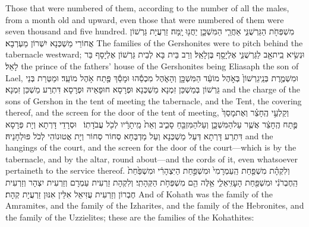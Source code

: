 {Those that were numbered of them, according to the number of all the males, from a month old and upward, even those that were numbered of them were seven thousand and five hundred.}{}
{מִשְׁפְּחֹ֖ת הַגֵּרְשֻׁנִּ֑י אַחֲרֵ֧י הַמִּשְׁכָּ֛ן יַחֲנ֖וּ יָֽמָּה׃}
{זַרְעֲיָת גֵּרְשׁוֹן אֲחוֹרֵי מַשְׁכְּנָא יִשְׁרוֹן מַעְרְבָא׃}
{The families of the Gershonites were to pitch behind the tabernacle westward;}{}
{וּנְשִׂ֥יא בֵֽית\maqqaf אָ֖ב לַגֵּרְשֻׁנִּ֑י אֶלְיָסָ֖ף בֶּן\maqqaf לָאֵֽל׃}
{וְרַב בֵּית בָּא לְבֵית גֵּרְשׁוֹן אֶלְיָסָף בַּר לָאֵל׃}
{the prince of the fathers’ house of the Gershonites being Eliasaph the son of Lael,}{}
{וּמִשְׁמֶ֤רֶת בְּנֵֽי\maqqaf גֵרְשׁוֹן֙ בְּאֹ֣הֶל מוֹעֵ֔ד הַמִּשְׁכָּ֖ן וְהָאֹ֑הֶל מִכְסֵ֕הוּ וּמָסַ֕ךְ פֶּ֖תַח אֹ֥הֶל מוֹעֵֽד׃}
{וּמַטְּרַת בְּנֵי גֵּרְשׁוֹן בְּמַשְׁכַּן זִמְנָא מַשְׁכְּנָא וּפְרָסָא חוּפָאֵיהּ וּפְרָסָא דִּתְרַע מַשְׁכַּן זִמְנָא׃}
{and the charge of the sons of Gershon in the tent of meeting the tabernacle, and the Tent, the covering thereof, and the screen for the door of the tent of meeting,}{}
{וְקַלְעֵ֣י הֶֽחָצֵ֗ר וְאֶת\maqqaf מָסַךְ֙ פֶּ֣תַח הֶֽחָצֵ֔ר אֲשֶׁ֧ר עַל\maqqaf הַמִּשְׁכָּ֛ן וְעַל\maqqaf הַמִּזְבֵּ֖חַ סָבִ֑יב וְאֵת֙ מֵֽיתָרָ֔יו לְכֹ֖ל עֲבֹדָתֽוֹ׃ \setuma }
{וּסְרָדֵי דָּרְתָא וְיָת פְּרָסָא דִּתְרַע דָּרְתָא דְּעַל מַשְׁכְּנָא וְעַל מַדְבְּחָא סְחוֹר סְחוֹר וְיָת אֲטוּנוֹהִי לְכֹל פּוּלְחָנֵיהּ׃}
{and the hangings of the court, and the screen for the door of the court—which is by the tabernacle, and by the altar, round about—and the cords of it, even whatsoever pertaineth to the service thereof.}{}
{וְלִקְהָ֗ת מִשְׁפַּ֤חַת הַֽעַמְרָמִי֙ וּמִשְׁפַּ֣חַת הַיִּצְהָרִ֔י וּמִשְׁפַּ֙חַת֙ הַֽחֶבְרֹנִ֔י וּמִשְׁפַּ֖חַת הָעׇזִּֽיאֵלִ֑י אֵ֥לֶּה הֵ֖ם מִשְׁפְּחֹ֥ת הַקְּהָתִֽי׃}
{וְלִקְהָת זַרְעִית עַמְרָם וְזַרְעִית יִצְהָר וְזַרְעִית חֶבְרוֹן וְזַרְעִית עֻזִּיאֵל אִלֵּין אִנּוּן זַרְעֲיָת קְהָת׃}
{And of Kohath was the family of the Amramites, and the family of the Izharites, and the family of the Hebronites, and the family of the Uzzielites; these are the families of the Kohathites:}{}

